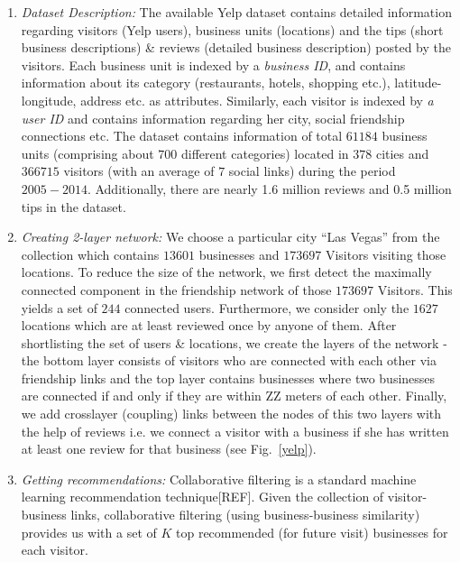  \begin{enumerate}
  \item \textit{Dataset Description:} The available Yelp dataset contains detailed information regarding visitors (Yelp users),
  business units (locations) and the tips (short business descriptions) \&
  reviews (detailed business description) posted by the visitors. Each business unit is indexed by
  a \textit{business ID}, and contains information about its category (restaurants, hotels, shopping etc.),
  latitude-longitude, address etc. as attributes.
  Similarly, each visitor is indexed by \textit{a user ID} and contains information regarding her city, social friendship connections etc.
  The dataset contains information of total $61184$ business units (comprising about $700$ different categories)
  located in $378$ cities and $366715$ visitors (with an average of $7$ social links) during the period $2005-2014$.
  Additionally, there are nearly 1.6 million reviews and 0.5 million tips in the dataset.

  \item \textit{Creating 2-layer network:} We choose a particular city ``Las Vegas'' from the collection which contains
  $13601$ businesses and $173697$ Visitors visiting those locations. To reduce the size of the network, we first detect
  the maximally connected component in the friendship network of those $173697$ Visitors. This yields a set
  of $244$ connected users. Furthermore, we consider only the $1627$ locations which are at least reviewed once by anyone of them.
  After shortlisting the set of users \& locations, we create the layers of the
  network - the bottom layer consists of
  visitors who are connected with each other via friendship links and the top layer contains businesses
  where two businesses are connected
  if and only if they are within ZZ meters of each other.
  Finally, we add crosslayer (coupling) links between the nodes of this two layers with the help of
  reviews i.e. we connect a visitor with a business if she has written at least one review for that business (see Fig.~\ref{yelp}).

  \item \textit{Getting recommendations:} Collaborative filtering is a standard machine learning recommendation
  technique[REF]. Given the collection of visitor-business links,
  collaborative filtering (using business-business similarity) provides us with a set of $K$ top
  recommended (for future visit) businesses for each visitor.
 \end{enumerate}


